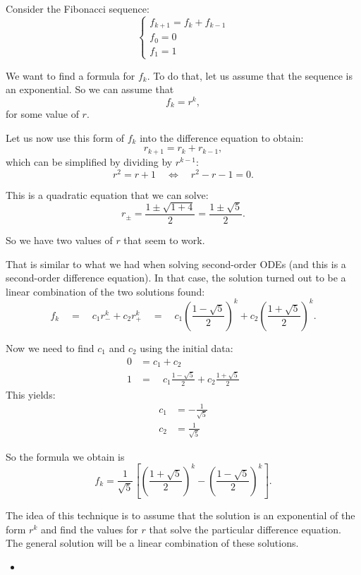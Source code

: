 \begin{example}
Consider the Fibonacci sequence:
$$
\begin{cases}
f_{k+1} = f_k + f_{k-1} \\
f_0 = 0 \\
f_1 = 1	
\end{cases}
$$

We want to find a formula for $f_k$. To do that, let us assume that the sequence is an exponential. So we can assume that
$$
f_k = r^k,
$$
for some value of $r$.

Let us now use this form of $f_k$ into the difference equation to obtain:
$$
r_{k+1} = r_k + r_{k-1},
$$
which can be simplified by dividing by $r^{k-1}$:
$$
r^2 = r + 1 \quad \Leftrightarrow \quad r^2 - r - 1 = 0.
$$

This is a quadratic equation that we can solve:
$$
r_{\pm} = \frac{1 \pm \sqrt{1 + 4}}{2} = \frac{1 \pm \sqrt{5}}{2}.
$$

So we have two values of $r$ that seem to work. 

That is similar to what we had when solving second-order ODEs (and this is a second-order difference equation).
In that case, the solution turned out to be a linear combination of the two solutions found:
$$
f_k 
	\quad = \quad  c_1 r_-^k + c_2 r_+^k
	\quad = \quad  c_1 \left(\frac{1 - \sqrt{5}}{2}\right)^k + c_2 \left(\frac{1 + \sqrt{5}}{2}\right)^k.
$$

Now we need to find $c_1$ and $c_2$ using the initial data:
\begin{align*}
0 & = c_1 + c_2
	\tag{$k=0$}	 \\
1 & = \quad  c_1 \frac{1 - \sqrt{5}}{2} + c_2 \frac{1 + \sqrt{5}}{2}
	\tag{$k=1$}
\end{align*}
This yields:
\begin{align*}
c_1 & = -\frac{1}{\sqrt{5}}\\
c_2 & = \frac{1}{\sqrt{5}}	
\end{align*}

So the formula we obtain is
$$
f_k =  \frac{1}{\sqrt{5}} \left[\left(\frac{1 + \sqrt{5}}{2}\right)^k - \left(\frac{1 - \sqrt{5}}{2}\right)^k \right].
$$
\end{example}


The idea of this technique is to assume that the solution is an exponential of the form $r^k$ and find the values for $r$ that solve the particular difference equation. The general solution will be a linear combination of these solutions.


\begin{video}
\begin{itemize}
	\item {}
\end{itemize}	
\end{video}


